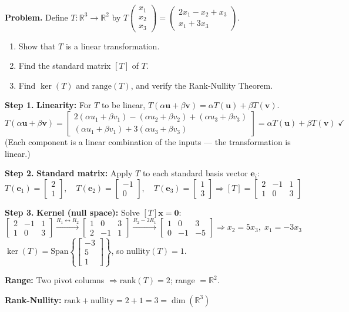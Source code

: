 \documentclass[12pt,a4paper]{article}
\newcommand{\step}[1]{\noindent\textbf{Step #1.}\;}
\newcommand{\R}{\mathbb{R}}
\newcommand{\mat}[1]{\begin{bmatrix}#1\end{bmatrix}}
\begin{document}
	\begin{tcolorbox}[worked]
		\textbf{Problem.} Define $T:\R^3\to\R^2$ by $T\!\begin{pmatrix}x_1\\x_2\\x_3\end{pmatrix}=\begin{pmatrix}2x_1-x_2+x_3\\x_1+3x_3\end{pmatrix}$.
		
		\begin{enumerate}[label=(\alph*), nosep]
			\item Show that $T$ is a linear transformation.
			\item Find the standard matrix $[T]$ of $T$.
			\item Find $\ker(T)$ and $\text{range}(T)$, and verify the Rank-Nullity Theorem.
		\end{enumerate}
		
		\step{1} \textbf{Linearity:} For $T$ to be linear, $T(\alpha\mathbf{u}+\beta\mathbf{v})=\alpha T(\mathbf{u})+\beta T(\mathbf{v})$.
		\[
		T(\alpha\mathbf{u}+\beta\mathbf{v})
		= \mat{2(\alpha u_1+\beta v_1)-(\alpha u_2+\beta v_2)+(\alpha u_3+\beta v_3)\\
			(\alpha u_1+\beta v_1)+3(\alpha u_3+\beta v_3)}
		= \alpha T(\mathbf{u})+\beta T(\mathbf{v}) \;\checkmark
		\]
		(Each component is a linear combination of the inputs — the transformation is linear.)
		
		\step{2} \textbf{Standard matrix:} Apply $T$ to each standard basis vector $\mathbf{e}_i$:
		\[
		T(\mathbf{e}_1)=\mat{2\\1},\quad T(\mathbf{e}_2)=\mat{-1\\0},\quad T(\mathbf{e}_3)=\mat{1\\3}
		\Rightarrow [T]=\mat{2&-1&1\\1&0&3}
		\]
		
		\step{3} \textbf{Kernel (null space):} Solve $[T]\mathbf{x}=\mathbf{0}$:
		\[
		\mat{2&-1&1\\1&0&3}\xrightarrow{R_1\leftrightarrow R_2}\mat{1&0&3\\2&-1&1}
		\xrightarrow{R_2-2R_1}\mat{1&0&3\\0&-1&-5}\Rightarrow
		x_2=5x_3,\;x_1=-3x_3
		\]
		$\ker(T)=\text{Span}\left\{\mat{-3\\5\\1}\right\}$, so $\text{nullity}(T)=1$.
		
		\textbf{Range:} Two pivot columns $\Rightarrow \text{rank}(T)=2$; range $=\R^2$.
		
		\textbf{Rank-Nullity:} $\text{rank}+\text{nullity}=2+1=3=\dim(\R^3)$ \;\checkmark
	\end{tcolorbox}
	
\end{document}
